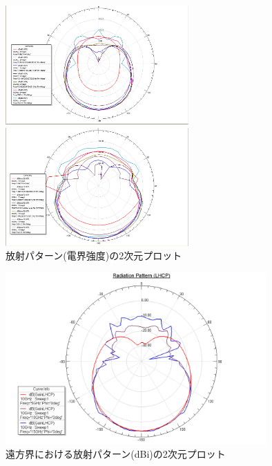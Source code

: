 \documentclass[11pt,a4paper,uplatex]{ujarticle}
\begin{document}
  \begin{figure}[tbp]
    \centering
    \begin{minipage}[b]{0.495\textwidth}
      \centering
      \includegraphics[keepaspectratio, width=70mm]{Images/rad_pattern_far.png}
    \end{minipage}
    \begin{minipage}[b]{0.495\textwidth}
      \centering
      \includegraphics[keepaspectratio, width=70mm]{Images/rad_pattern_near.png}
    \end{minipage}
    \caption{放射パターン(電界強度)の2次元プロット}\label{fig:radiation_pattern_2D}
  \end{figure}
  \begin{figure}[hbtp]
    \centering
    \includegraphics[keepaspectratio, width=100mm]{Images/radiation_pattern_lhcp.png}
    \caption{遠方界における放射パターン(dBi)の2次元プロット}
    \label{fig:radiation_pattern_lhcp}
  \end{figure}
\end{document}
